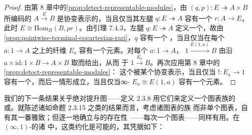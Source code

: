 \begin{proof}
由第 8 章中的\cref{prop:detect-representable-modules}，由 $(q,p)\colon E\twoheadrightarrow A\times B$ 所编码的%
\trModule{} $A\xrightarrow{E}B$ 是协变表示的，当且仅当其左腿
$q\colon E\twoheadrightarrow A$ 容有一个\trRightAdjoint\trRightInverse{}
$r\colon A\to E$，此时 $E\cong\mathrm{Hom}_{B}(B,pr)$。由引理 7.4.3，左腿
$q\colon E\twoheadrightarrow A$ 定义一个\trCocartesianFibration，故由%
\cref{prop:pointwise-terminal-cocartesian-rari}，$q$ 容有一个%
\trRightAdjoint\trRightInverse，当且仅当在每个\trElement{} $a\colon 1\to A$
之上的纤维 $E_{a}$ 容有一个\trTerminal{}元素。对每个\trElement{}
$a\colon 1\to A$，\trModule{} $1\xrightarrow{E(1,a)}B$ 由沿
$a\times\mathrm{id}\colon 1\times B\to A\times B$ 取\trPullback{}而给出，从而%
\trIsomorphism{}于\trModule{} $1\xrightarrow{E_{a}}B$。再次应用第 8 章中的%
\cref{prop:detect-representable-modules}：
这个\trModule{}被某个\trElement{}协变表示，当且仅当 $!\colon E_{a}\to 1$
容有一个\trRightAdjoint\trRightInverse，而后一情形成立，当且仅当∞-%
\trCategory{} $E_{a}\cong E(1,a)$ 容有一个\trTerminal{}元素。
\end{proof}

我们的下一条结果关乎绝对提升图——定义 2.3.8 用它们来定义一个图表族的%
\trLimit{}或\trColimit。就陈述诸如命题 2.3.15 之类的结果而言，考虑诸图表的族
而非单个图表，自有其一番雅致；但逐一地确立\trLimit{}与\trColimit{}的存在性
——每次一个图表——同样有用。在 $(\infty,1)$-\trCategory{}的诸%
\trInfinityCosmos{}中，这类约化是可能的，其凭据如下：

